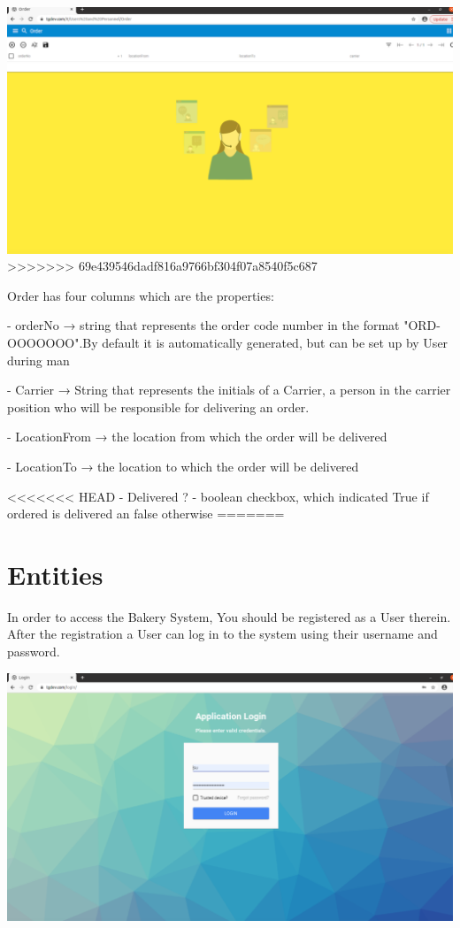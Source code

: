 \includegraphics[width=\textwidth]{sections/01-chapter/images/order3.png}
>>>>>>> 69e439546dadf816a9766bf304f07a8540f5c687

Order has four columns which are the properties:

- orderNo → string that represents the order code number in the format "ORD-OOOOOOO".By default it is automatically generated, but can be set up by User during man

- Carrier → String that represents the initials of a  Carrier, a person in the carrier position who will be responsible for delivering an order.

- LocationFrom → the location from which the order will be delivered

- LocationTo → the location to which the order will be delivered

<<<<<<< HEAD
- Delivered ? - boolean checkbox, which indicated True if ordered is delivered an false otherwise
=======\section{Entities}\label{sec:01}
In order to access the Bakery System, You should be registered as a User therein. 
After the registration a User can log in to the system using their username and password.

\includegraphics[width=\textwidth]{sections/01-chapter/images/login.png}

